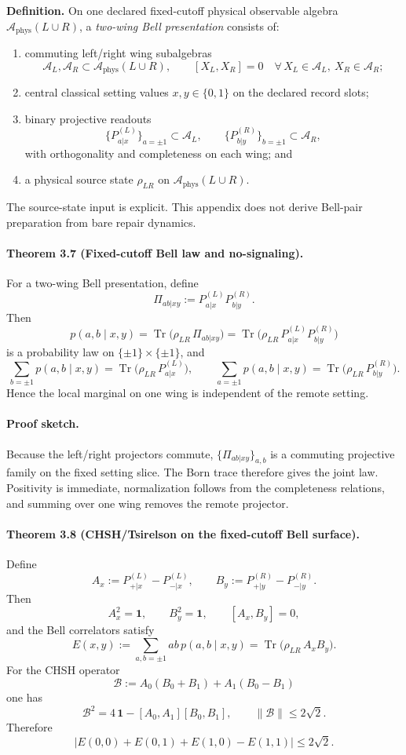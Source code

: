 \textbf{Definition.} On one declared fixed-cutoff physical observable algebra
\(\mathcal A_{\mathrm{phys}}(L\cup R)\), a \emph{two-wing Bell presentation} consists of:
\begin{enumerate}[leftmargin=2em]
\item commuting left/right wing subalgebras
\[
\mathcal A_L,\mathcal A_R\subset \mathcal A_{\mathrm{phys}}(L\cup R),
\qquad
[X_L,X_R]=0
\quad
\forall\,X_L\in\mathcal A_L,\ X_R\in\mathcal A_R;
\]
\item central classical setting values \(x,y\in\{0,1\}\) on the declared record slots;
\item binary projective readouts
\[
\{P_{a|x}^{(L)}\}_{a=\pm1}\subset\mathcal A_L,
\qquad
\{P_{b|y}^{(R)}\}_{b=\pm1}\subset\mathcal A_R,
\]
with orthogonality and completeness on each wing; and
\item a physical source state \(\rho_{LR}\) on \(\mathcal A_{\mathrm{phys}}(L\cup R)\).
\end{enumerate}
The source-state input is explicit. This appendix does not derive Bell-pair preparation from
bare repair dynamics.

\paragraph{\textbf{Theorem 3.7 (Fixed-cutoff Bell law and no-signaling).}}
For a two-wing Bell presentation, define
\[
\Pi_{ab|xy}:=P_{a|x}^{(L)}P_{b|y}^{(R)}.
\]
Then
\[
p(a,b\mid x,y)
=
\operatorname{Tr}\!\bigl(\rho_{LR}\,\Pi_{ab|xy}\bigr)
=
\operatorname{Tr}\!\bigl(\rho_{LR}\,P_{a|x}^{(L)}P_{b|y}^{(R)}\bigr)
\]
is a probability law on \(\{ \pm1\}\times\{\pm1\}\), and
\[
\sum_{b=\pm1} p(a,b\mid x,y)
=
\operatorname{Tr}\!\bigl(\rho_{LR}\,P_{a|x}^{(L)}\bigr),
\qquad
\sum_{a=\pm1} p(a,b\mid x,y)
=
\operatorname{Tr}\!\bigl(\rho_{LR}\,P_{b|y}^{(R)}\bigr).
\]
Hence the local marginal on one wing is independent of the remote setting.

\paragraph{\textbf{Proof sketch.}}
Because the left/right projectors commute, \(\{\Pi_{ab|xy}\}_{a,b}\) is a commuting projective
family on the fixed setting slice. The Born trace therefore gives the joint law. Positivity is
immediate, normalization follows from the completeness relations, and summing over one wing
removes the remote projector.

\paragraph{\textbf{Theorem 3.8 (CHSH/Tsirelson on the fixed-cutoff Bell surface).}}
Define
\[
A_x:=P_{+|x}^{(L)}-P_{-|x}^{(L)},
\qquad
B_y:=P_{+|y}^{(R)}-P_{-|y}^{(R)}.
\]
Then
\[
A_x^2=\mathbf 1,
\qquad
B_y^2=\mathbf 1,
\qquad
[A_x,B_y]=0,
\]
and the Bell correlators satisfy
\[
E(x,y)
:=
\sum_{a,b=\pm1}ab\,p(a,b\mid x,y)
=
\operatorname{Tr}\!\bigl(\rho_{LR}\,A_xB_y\bigr).
\]
For the CHSH operator
\[
\mathcal B:=A_0(B_0+B_1)+A_1(B_0-B_1)
\]
one has
\[
\mathcal B^2
=
4\,\mathbf 1-[A_0,A_1][B_0,B_1],
\qquad
\|\mathcal B\|\le 2\sqrt2.
\]
Therefore
\[
\bigl|E(0,0)+E(0,1)+E(1,0)-E(1,1)\bigr|
\le
2\sqrt2.
\]

